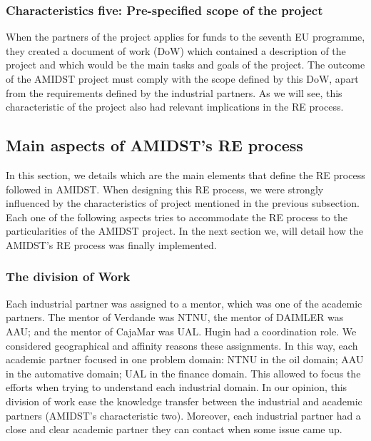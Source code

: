 \documentclass[11pt, oneside]{article}   	%
\begin{document}



\subsubsection*{Characteristics five:  Pre-specified scope of the project}
\label{sec:characteristic5}

When the partners of the project applies for funds to the seventh EU programme,  they created a document of work (DoW) which contained a description of the project and which would be the main tasks and goals of the project. The outcome of the AMIDST project must comply with the scope defined by this DoW, apart from the requirements defined by the industrial partners. As we will see, this characteristic of the project also had relevant implications  in the RE process.

\subsection{Main aspects of  AMIDST's RE process}
\label{sec:reprocess}

In this section, we details which are the main elements that define the RE process followed in AMIDST. When designing this RE process, we were strongly influenced by the characteristics of project mentioned in the previous subsection. Each one of the following aspects tries to accommodate the RE process to the particularities of the AMIDST project. In the next section we, will detail how the AMIDST's RE process was finally implemented. 

\subsubsection*{The division of Work}

Each industrial partner was assigned to a mentor, which was one of the academic partners. The mentor of Verdande was NTNU, the mentor of DAIMLER was AAU; and the mentor of CajaMar was UAL. Hugin had a coordination role. We considered geographical and affinity reasons these assignments. In this way, each academic partner focused in one problem domain: NTNU in the oil domain; AAU in the automative domain; UAL in the finance domain. This allowed to focus the efforts when trying to understand each industrial domain. In our opinion, this division of work ease the knowledge transfer between the industrial and academic partners (AMIDST's characteristic two). Moreover, each industrial partner had a close and clear academic partner they can contact when some issue came up. 
\end{document}
